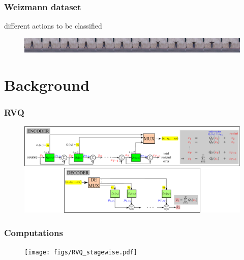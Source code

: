 \begin{frame}
\frametitle{Weizmann dataset}
 different actions to be classified
	\begin{figure}	
		\includegraphics[width=1.0\textwidth]{figs/RVQ_HMM_IPCV2010_Weizmann_dataset.pdf}
	\end{figure}
	\hspace{0.6in}
\end{frame}


\section{Background}
\begin{frame}[plain]
\frametitle{RVQ}
\logoCSIPCPL
	\begin{changemargin}{-1.3in}{0in}
		\begin{figure}				
			\includegraphics[width=1.3\textwidth]{figs/RVQ_blockDiagram.pdf}
			\label{fig:RVQ_SQ_DMSE}
		\end{figure}
	\end{changemargin}
\end{frame}




\begin{frame}[plain]
\frametitle{Computations}
\logoCSIPCPL
	\begin{changemargin}{-1.3in}{0in}
		\begin{figure}				
			\texttt{[image: figs/RVQ\_stagewise.pdf]}
			\label{fig:RVQ_SQ_DMSE}
		\end{figure}
	\end{changemargin}
\end{frame}




